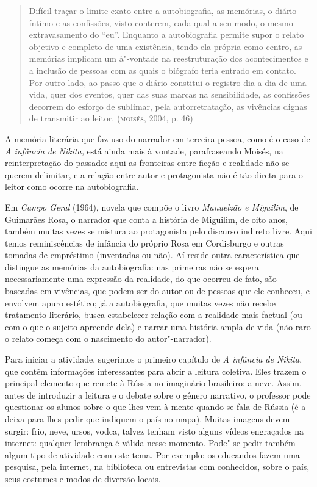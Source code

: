 \documentclass{article}
\begin{document}
\begin{quote}
Difícil traçar o limite exato entre a autobiografia, as memórias, o
diário íntimo e as confissões, visto conterem, cada qual a seu modo, o
mesmo extravasamento do ``eu''. Enquanto a autobiografia permite supor o
relato objetivo e completo de uma existência, tendo ela própria como
centro, as memórias implicam um à"-vontade na reestruturação dos
acontecimentos e a inclusão de pessoas com as quais o biógrafo teria
entrado em contato. Por outro lado, ao passo que o diário constitui o
registro dia a dia de uma vida, quer dos eventos, quer das suas marcas
na sensibilidade, as confissões decorrem do esforço de sublimar, pela
autorretratação, as vivências dignas de transmitir ao leitor. (\textsc{moisés},
2004, p. 46)
\end{quote}

A memória literária que faz uso do narrador em terceira pessoa, como é o
caso de \emph{A infância de Nikita,} está ainda mais à vontade,
parafraseando Moisés, na reinterpretação do passado: aqui as fronteiras
entre ficção e realidade não se querem delimitar, e a relação entre
autor e protagonista não é tão direta para o leitor como ocorre na
autobiografia.

Em \emph{Campo Geral} (1964), novela que compõe o livro \emph{Manuelzão
e Miguilim}, de Guimarães Rosa, o narrador que conta a história de
Miguilim, de oito anos, também muitas vezes se mistura ao protagonista
pelo discurso indireto livre. Aqui temos reminiscências de infância do
próprio Rosa em Cordisburgo e outras tomadas de empréstimo (inventadas
ou não). Aí reside outra característica que distingue as memórias da
autobiografia: nas primeiras não se espera necessariamente uma expressão
da realidade, do que ocorreu de fato, são baseadas em vivências, que
podem ser do autor ou de pessoas que ele conheceu, e envolvem apuro
estético; já a autobiografia, que muitas vezes não recebe tratamento
literário, busca estabelecer relação com a realidade mais factual (ou
com o que o sujeito apreende dela) e narrar uma história ampla de vida
(não raro o relato começa com o nascimento do autor"-narrador).

Para iniciar a atividade, sugerimos o primeiro capítulo de \emph{A
infância de Nikita}, que contêm informações interessantes para abrir a
leitura coletiva. Eles trazem o principal elemento que remete à Rússia
no imaginário brasileiro: a neve. Assim, antes de introduzir a leitura e
o debate sobre o gênero narrativo, o professor pode questionar os alunos
sobre o que lhes vem à mente quando se fala de Rússia (é a deixa para
lhes pedir que indiquem o país no mapa). Muitas imagens devem surgir:
frio, neve, ursos, vodca, talvez tenham visto alguns vídeos engraçados
na internet: qualquer lembrança é válida nesse momento. Pode"-se pedir
também algum tipo de atividade com este tema. Por exemplo: os educandos
fazem uma pesquisa, pela internet, na biblioteca ou entrevistas com
conhecidos, sobre o país, seus costumes e modos de diversão locais.
\end{document}

